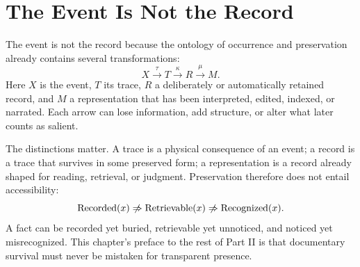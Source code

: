 
\chapter{The Event Is Not the Record}
\label{ch:ch006}


The event is not the record because the ontology of occurrence and preservation already contains several transformations:
\[
X \xrightarrow{\tau} T
\xrightarrow{\kappa} R
\xrightarrow{\mu} M.
\]
Here \(X\) is the event, \(T\) its trace, \(R\) a deliberately or automatically retained record, and \(M\) a representation that has been interpreted, edited, indexed, or narrated. Each arrow can lose information, add structure, or alter what later counts as salient.

The distinctions matter. A trace is a physical consequence of an event; a record is a trace that survives in some preserved form; a representation is a record already shaped for reading, retrieval, or judgment. Preservation therefore does not entail accessibility:
\[
\operatorname{Recorded}(x)
\centernot\Rightarrow
\operatorname{Retrievable}(x)
\centernot\Rightarrow
\operatorname{Recognized}(x).
\]
A fact can be recorded yet buried, retrievable yet unnoticed, and noticed yet misrecognized. This chapter's preface to the rest of Part II is that documentary survival must never be mistaken for transparent presence.
